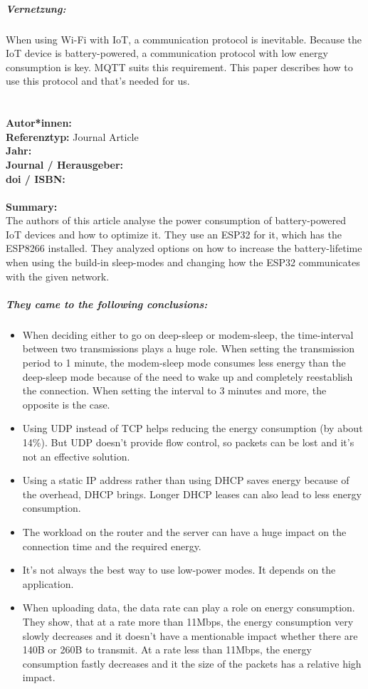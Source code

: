 \documentclass{report}
\newcommand{\createJournalArticleHeader}[1]{
    {\let\clearpage\relax \chapter{\citetitle{#1}}}
    \noindent
    \textbf{Autor*innen:} \citeauthor{#1} \\
    \textbf{Referenztyp:} Journal Article\\
    \textbf{Jahr:} \citeyear{#1} \\
    \textbf{Journal / Herausgeber:} \citefield{#1}{journaltitle}\\
    \textbf{doi / ISBN:} \citefield{#1}{doi} \\\\
    \textbf{Summary:}\\
}
\begin{document}
\paragraph{Vernetzung:}
When using Wi-Fi with IoT, a communication protocol is inevitable. Because the IoT device is battery-powered, a communication protocol with low energy consumption is key. MQTT suits this requirement. This paper describes how to use this protocol and that's needed for us.


\createJournalArticleHeader{department_of_computer_engineering_mehmet_akif_ersoy_university_faculty_of_engineering_and_architecture_burdur_turkey_power_2020}
The authors of this article analyse the power consumption of battery-powered IoT devices and how to optimize it. They use an ESP32 for it, which has the ESP8266 installed. They analyzed options on how to increase the battery-lifetime when using the build-in sleep-modes and changing how the ESP32 communicates with the given network.\\
\paragraph{They came to the following conclusions:}
\begin{itemize}
    \item When deciding either to go on deep-sleep or modem-sleep, the time-interval between two transmissions plays a huge role. When setting the transmission period to 1 minute, the modem-sleep mode consumes less energy than the deep-sleep mode because of the need to wake up and completely reestablish the connection. When setting the interval to 3 minutes and more, the opposite is the case.
    \item Using UDP instead of TCP helps reducing the energy consumption (by about 14\%). But UDP doesn't provide flow control, so packets can be lost and it's not an effective solution.
    \item Using a static IP address rather than using DHCP saves energy because of the overhead, DHCP brings. Longer DHCP leases can also lead to less energy consumption.
    \item The workload on the router and the server can have a huge impact on the connection time and the required energy.  
    \item It's not always the best way to use low-power modes. It depends on the application. 
    \item When uploading data, the data rate can play a role on energy consumption. They show, that at a rate more than 11Mbps, the energy consumption very slowly decreases and it doesn't have a mentionable impact whether there are 140B or 260B to transmit. At a rate less than 11Mbps, the energy consumption fastly decreases and it the size of the packets has a relative high impact.
\end{itemize} 
\end{document}
